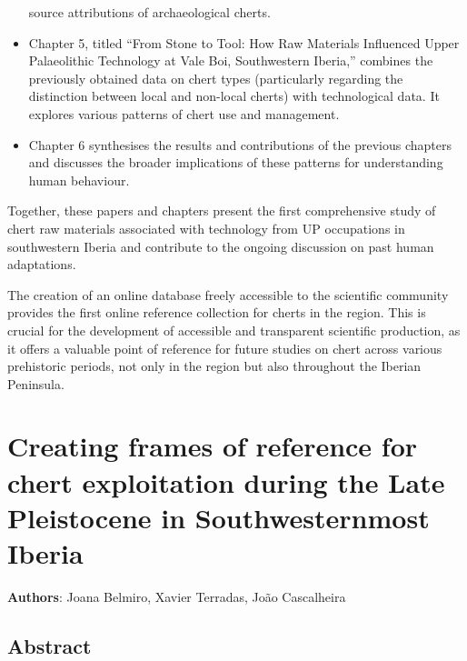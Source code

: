 \documentclass[
  a4paper,
  DIV=11,
  numbers=noendperiod]{scrreprt}
\begin{document}
\begin{itemize}
  source attributions of archaeological cherts.
\item
  Chapter 5, titled ``From Stone to Tool: How Raw Materials Influenced
  Upper Palaeolithic Technology at Vale Boi, Southwestern Iberia,''
  combines the previously obtained data on chert types (particularly
  regarding the distinction between local and non-local cherts) with
  technological data. It explores various patterns of chert use and
  management.
\item
  Chapter 6 synthesises the results and contributions of the previous
  chapters and discusses the broader implications of these patterns for
  understanding human behaviour.
\end{itemize}

Together, these papers and chapters present the first comprehensive
study of chert raw materials associated with technology from UP
occupations in southwestern Iberia and contribute to the ongoing
discussion on past human adaptations.

The creation of an online database freely accessible to the scientific
community provides the first online reference collection for cherts in
the region. This is crucial for the development of accessible and
transparent scientific production, as it offers a valuable point of
reference for future studies on chert across various prehistoric
periods, not only in the region but also throughout the Iberian
Peninsula.


\chapter{Creating frames of reference for chert exploitation during the
Late Pleistocene in Southwesternmost
Iberia}\label{creating-frames-of-reference-for-chert-exploitation-during-the-late-pleistocene-in-southwesternmost-iberia}

\textbf{Authors}: Joana Belmiro, Xavier Terradas, João Cascalheira

\newpage

\section*{Abstract}\label{abstract-1}

\end{document}
